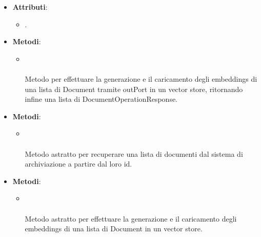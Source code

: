 \documentclass[10pt, a4paper]{article}
\begin{document}
\label{EmbeddingsUploaderDettaglio}
\begin{itemize}
    \item \textbf{Attributi}:
    \begin{itemize}
        \item {}.
    \end{itemize}
    \item \textbf{Metodi}:
    \begin{itemize}
        \item {}\\ \\
        Metodo per effettuare la generazione e il caricamento degli embeddings di una lista di Document tramite outPort in un vector store, ritornando infine una lista di DocumentOperationResponse.
    \end{itemize}
\end{itemize}

\label{GetDocumentsPortDettaglio}
\begin{itemize}
    \item \textbf{Metodi}:
    \begin{itemize}
        \item {}\\ \\
        Metodo astratto per recuperare una lista di documenti dal sistema di archiviazione a partire dal loro id.
    \end{itemize}
\end{itemize}

\label{EmbeddingsUploaderPortDettaglio}
\begin{itemize}
    \item \textbf{Metodi}:
    \begin{itemize}
        \item {}\\ \\
        Metodo astratto per effettuare la generazione e il caricamento degli embeddings di una lista di Document in un vector store.
    \end{itemize}
\end{itemize}
\end{document}
